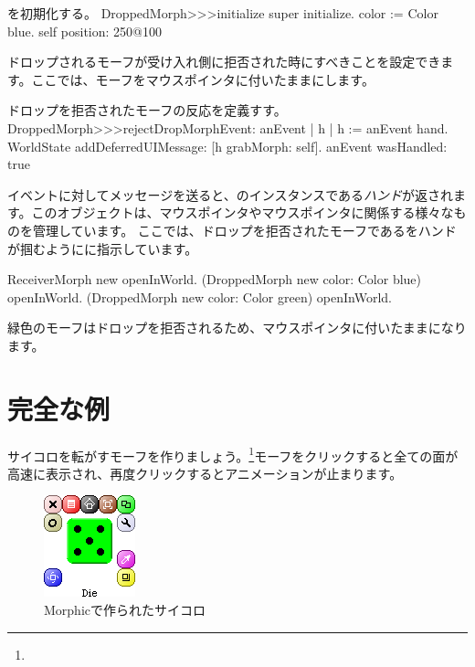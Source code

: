 \documentclass[a4paper,10pt,twoside]{book}
\begin{document}
\begin{method}{を初期化する。}
DroppedMorph>>>initialize
	super initialize.
	color := Color blue.
	self position: 250@100
\end{method}

ドロップされるモーフが受け入れ側に拒否された時にすべきことを設定できます。ここでは、モーフをマウスポインタに付いたままにします。
\begin{method}{ドロップを拒否されたモーフの反応を定義すす。}
DroppedMorph>>>rejectDropMorphEvent: anEvent
	| h |
	h := anEvent hand.
	WorldState
		addDeferredUIMessage: [h grabMorph: self].
	anEvent wasHandled: true
\end{method}

イベントに対してメッセージを送ると、のインスタンスである\emph{ハンド}が返されます。このオブジェクトは、マウスポインタやマウスポインタに関係する様々なものを管理しています。
ここでは、ドロップを拒否されたモーフであるをハンドが掴むようにに指示しています。

\begin{code}{}
ReceiverMorph new openInWorld.
(DroppedMorph new color: Color blue) openInWorld.
(DroppedMorph new color: Color green) openInWorld.
\end{code}
\noindent
緑色のモーフはドロップを拒否されるため、マウスポインタに付いたままになります。

\section{完全な例}

サイコロを転がすモーフを作りましょう。\footnote{}モーフをクリックすると全ての面が高速に表示され、再度クリックするとアニメーションが止まります。

\begin{figure}[ht]
	\centerline{\includegraphics[scale=0.65]{die}}
	\caption{Morphicで作られたサイコロ
		}
\end{figure}
\end{document}

